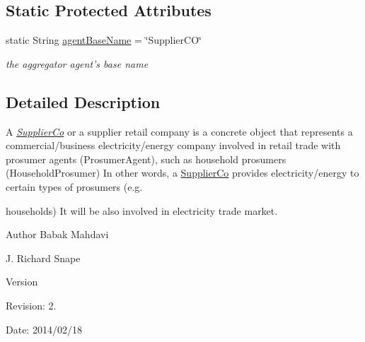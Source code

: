 \subsection*{Static Protected Attributes}
\begin{DoxyCompactItemize}
\item 
\hypertarget{classuk_1_1ac_1_1dmu_1_1iesd_1_1cascade_1_1agents_1_1aggregators_1_1_supplier_co_advanced_model_aa75f64fc9e3affecede7fd316ca0c066}{static String \hyperlink{classuk_1_1ac_1_1dmu_1_1iesd_1_1cascade_1_1agents_1_1aggregators_1_1_supplier_co_advanced_model_aa75f64fc9e3affecede7fd316ca0c066}{agent\-Base\-Name} = \char`\"{}Supplier\-C\-O\char`\"{}}\label{classuk_1_1ac_1_1dmu_1_1iesd_1_1cascade_1_1agents_1_1aggregators_1_1_supplier_co_advanced_model_aa75f64fc9e3affecede7fd316ca0c066}

\begin{DoxyCompactList}\small\item\em the aggregator agent's base name \end{DoxyCompactList}\end{DoxyCompactItemize}


\subsection{Detailed Description}
A {\itshape \hyperlink{classuk_1_1ac_1_1dmu_1_1iesd_1_1cascade_1_1agents_1_1aggregators_1_1_supplier_co}{Supplier\-Co}} or a supplier retail company is a concrete object that represents a commercial/business electricity/energy company involved in retail trade with prosumer agents ({\ttfamily Prosumer\-Agent}), such as household prosumers ({\ttfamily Household\-Prosumer}) In other words, a {\ttfamily \hyperlink{classuk_1_1ac_1_1dmu_1_1iesd_1_1cascade_1_1agents_1_1aggregators_1_1_supplier_co}{Supplier\-Co}} provides electricity/energy to certain types of prosumers (e.\-g. 

households) It will be also involved in electricity trade market.

\begin{DoxyAuthor}{Author}
Babak Mahdavi 

J. Richard Snape 
\end{DoxyAuthor}
\begin{DoxyVersion}{Version}

\end{DoxyVersion}
\begin{DoxyParagraph}{Revision\-:}
2. 
\end{DoxyParagraph}
\begin{DoxyParagraph}{Date\-:}
2014/02/18 
\end{DoxyParagraph}


